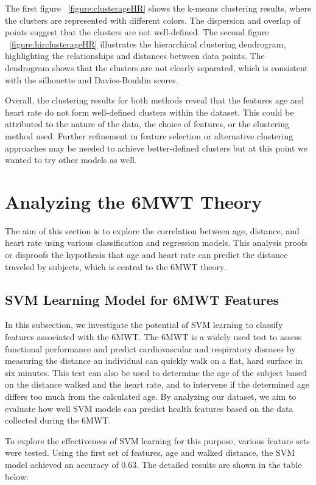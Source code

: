 The first figure ~\ref{figure:clusterageHR} shows the k-means clustering results, where the clusters are represented with different colors. The dispersion and overlap of points suggest that the clusters are not well-defined. The second figure ~\ref{figure:hirclusterageHR} illustrates the hierarchical clustering dendrogram, highlighting the relationships and distances between data points. The dendrogram shows that the clusters are not clearly separated, which is consistent with the silhouette and Davies-Bouldin scores.

Overall, the clustering results for both methods reveal that the features age and heart rate do not form well-defined clusters within the dataset. This could be attributed to the nature of the data, the choice of features, or the clustering method used. Further refinement in feature selection or alternative clustering approaches may be needed to achieve better-defined clusters but at this point we wanted to try other models as well.

\section{Analyzing the 6MWT Theory}

The aim of this section is to explore the correlation between age, distance, and heart rate using various classification and regression models. This analysis proofs or disproofs the hypothesis that age and heart rate can predict the distance traveled by subjects, which is central to the 6MWT theory.

\subsection{SVM Learning Model for 6MWT Features}

In this subsection, we investigate the potential of SVM learning to classify features associated with the 6MWT. The 6MWT is a widely used test to assess functional performance and predict cardiovascular and respiratory diseases by measuring the distance an individual can quickly walk on a flat, hard surface in six minutes. This test can also be used to determine the age of the subject based on the distance walked and the heart rate, and to intervene if the determined age differs too much from the calculated age. By analyzing our dataset, we aim to evaluate how well SVM models can predict health features based on the data collected during the 6MWT.

To explore the effectiveness of SVM learning for this purpose, various feature sets were tested. Using the first set of features, age and walked distance, the SVM model achieved an accuracy of 0.63. The detailed results are shown in the table below:

